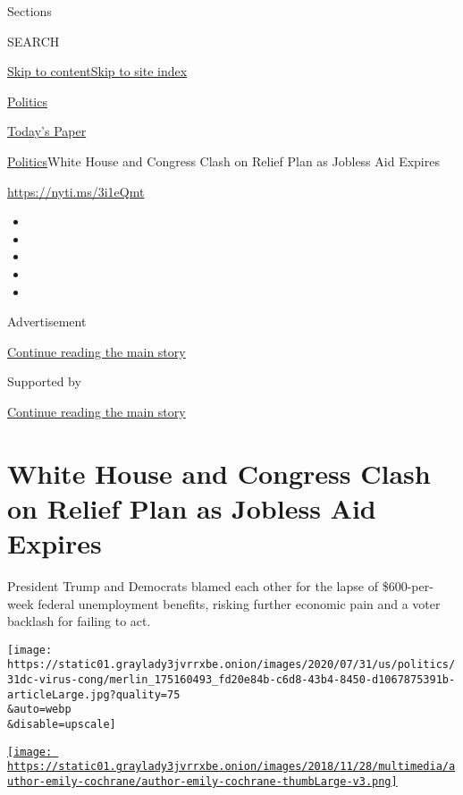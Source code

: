 Sections

SEARCH

\protect\hyperlink{site-content}{Skip to
content}\protect\hyperlink{site-index}{Skip to site index}

\href{https://www.nytimes3xbfgragh.onion/section/politics}{Politics}

\href{https://myaccount.nytimes3xbfgragh.onion/auth/login?response_type=cookie\&client_id=vi}{}

\href{https://www.nytimes3xbfgragh.onion/section/todayspaper}{Today's
Paper}

\href{/section/politics}{Politics}\textbar{}White House and Congress
Clash on Relief Plan as Jobless Aid Expires

\url{https://nyti.ms/3i1eQmt}

\begin{itemize}
\item
\item
\item
\item
\item
\end{itemize}

Advertisement

\protect\hyperlink{after-top}{Continue reading the main story}

Supported by

\protect\hyperlink{after-sponsor}{Continue reading the main story}

\hypertarget{white-house-and-congress-clash-on-relief-plan-as-jobless-aid-expires}{%
\section{White House and Congress Clash on Relief Plan as Jobless Aid
Expires}\label{white-house-and-congress-clash-on-relief-plan-as-jobless-aid-expires}}

President Trump and Democrats blamed each other for the lapse of
\$600-per-week federal unemployment benefits, risking further economic
pain and a voter backlash for failing to act.

\texttt{[image: https://static01.graylady3jvrrxbe.onion/images/2020/07/31/us/politics/31dc-virus-cong/merlin\_175160493\_fd20e84b-c6d8-43b4-8450-d1067875391b-articleLarge.jpg?quality=75\\\&auto=webp\\\&disable=upscale]}

\href{https://www.nytimes3xbfgragh.onion/by/emily-cochrane}{\texttt{[image: https://static01.graylady3jvrrxbe.onion/images/2018/11/28/multimedia/author-emily-cochrane/author-emily-cochrane-thumbLarge-v3.png]}}

